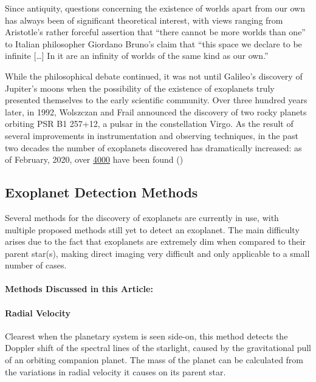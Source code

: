 \documentclass[11pt]{article}
\begin{document}
Since antiquity, questions concerning the existence of worlds apart
from our own has always been of significant theoretical interest, with
views ranging from Aristotle's rather forceful assertion that ``there cannot be more worlds than one'' to Italian philosopher Giordano Bruno's claim that
``this space we declare to be infinite {[}\ldots{]} In it are an
infinity of worlds of the same kind as our own.''

While the philosophical debate continued, it was not until Galileo's
discovery of Jupiter's moons when the possibility of the existence of
exoplanets truly presented themselves to the early scientific community.
Over three hundred years later, in 1992, Wolszczan and Frail \parencite*{Wolszczan} announced the discovery of two rocky planets orbiting PSR B1 257+12, a pulsar in the constellation Virgo. As the result of several improvements in instrumentation and observing techniques, in the past two decades the number of exoplanets discovered has dramatically increased: as of February, 2020, over \href{http://exoplanet.eu/catalog/}{4000} have been found (\cite{Schneider})

    \hypertarget{exoplanet-detection-methods}{%
\subsection{Exoplanet Detection Methods}\label{exoplanet-detection-methods}}

Several methods for the discovery of exoplanets are currently in use,
with multiple proposed methods still yet to detect an exoplanet. The
main difficulty arises due to the fact that exoplanets are extremely dim
when compared to their parent star(s), making direct imaging very difficult
and only applicable to a small number of cases.

\hypertarget{methods-discussed-in-this-article}{%
\paragraph{Methods Discussed in this Article:}\label{methods-discussed-in-this-article}}

\hypertarget{radial-velocity}{%
\paragraph{Radial Velocity}\label{radial-velocity}}

Clearest when the planetary system is seen side-on, this method detects
the Doppler shift of the spectral lines of the starlight, caused by the
gravitational pull of an orbiting companion planet. The mass of the
planet can be calculated from the variations in radial velocity it
causes on its parent star.
\end{document}
